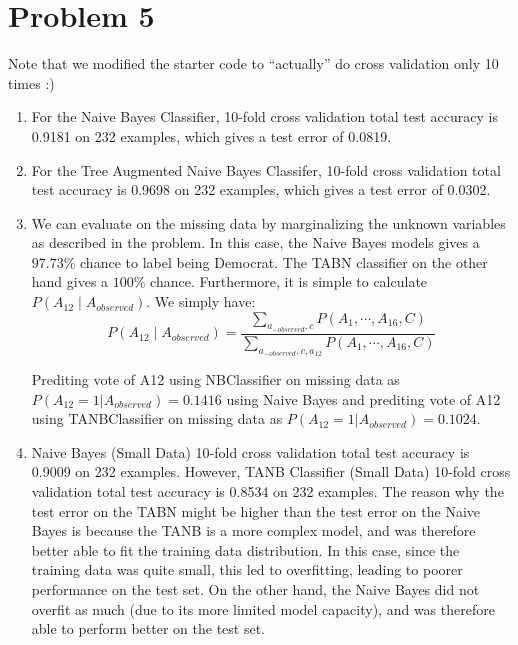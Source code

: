 \documentclass[12pt]{article}
\begin{document}
\pagebreak
\section*{Problem 5}

Note that we modified the starter code to ``actually'' do cross validation only 10 times :)
\begin{enumerate}[label=(\alph*)]
\item For the Naive Bayes Classifier, 10-fold cross validation total test accuracy is 0.9181 on 232 examples, which gives a test error of 0.0819.
\item For the Tree Augmented Naive Bayes Classifer, 10-fold cross validation total test accuracy is 0.9698 on 232 examples, which gives a test error of 0.0302.
\item We can evaluate on the missing data by marginalizing the unknown variables as described in the problem. In this case, the Naive Bayes models gives a $97.73\%$ chance to label being Democrat. The TABN classifier on the other hand gives a $100\%$ chance. Furthermore, it is simple to calculate $P(A_{12} \mid A_{observed})$. We simply have:
$$
P(A_{12} \mid A_{observed}) = \frac{\sum_{a_{-observed}, c}P(A_1, \cdots, A_{16}, C)}{\sum_{a_{-observed},c,a_{12}}P(A_1, \cdots, A_{16}, C)}
$$

Prediting vote of A12 using NBClassifier on missing data as $P(A_{12}=1|A_{observed}) = 0.1416$ using Naive Bayes and prediting vote of A12 using TANBClassifier on missing data as $P(A_{12}=1|A_{observed}) = 0.1024$.

\item Naive Bayes (Small Data) 10-fold cross validation total test accuracy is 0.9009 on 232 examples. However, TANB Classifier (Small Data) 10-fold cross validation total test accuracy is 0.8534 on 232 examples. The reason why the test error on the TABN might be higher than the test error on the Naive Bayes is because the TANB is a more complex model, and was therefore better able to fit the training data distribution. In this case, since the training data was quite small, this led to overfitting, leading to poorer performance on the test set. On the other hand, the Naive Bayes did not overfit as much (due to its more limited model capacity), and was therefore able to perform better on the test set.
\end{enumerate}
\end{document}
